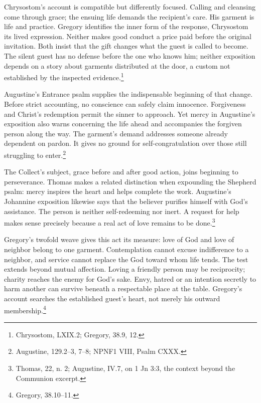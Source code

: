 Chrysostom's account is compatible but differently focused. Calling and cleansing come through grace; the ensuing life demands the recipient's care. His garment is life and practice. Gregory identifies the inner form of the response, Chrysostom its lived expression. Neither makes good conduct a price paid before the original invitation. Both insist that the gift changes what the guest is called to become. The silent guest has no defense before the one who knows him; neither exposition depends on a story about garments distributed at the door, a custom not established by the inspected evidence.\footnote{Chrysostom,  LXIX.2; Gregory,  38.9, 12.}

Augustine's Entrance psalm supplies the indispensable beginning of that change. Before strict accounting, no conscience can safely claim innocence. Forgiveness and Christ's redemption permit the sinner to approach. Yet mercy in Augustine's exposition also warns concerning the life ahead and accompanies the forgiven person along the way. The garment's demand addresses someone already dependent on pardon. It gives no ground for self-congratulation over those still struggling to enter.\footnote{Augustine,  129.2--3, 7--8; NPNF1 VIII, Psalm CXXX.}

The Collect's subject, grace before and after good action, joins beginning to perseverance. Thomas makes a related distinction when expounding the Shepherd psalm: mercy inspires the heart and helps complete the work. Augustine's Johannine exposition likewise says that the believer purifies himself with God's assistance. The person is neither self-redeeming nor inert. A request for help makes sense precisely because a real act of love remains to be done.\footnote{Thomas,  22, n. 2; Augustine,  IV.7, on 1 Jn 3:3, the context beyond the Communion excerpt.}

Gregory's twofold weave gives this act its measure: love of God and love of neighbor belong to one garment. Contemplation cannot excuse indifference to a neighbor, and service cannot replace the God toward whom life tends. The test extends beyond mutual affection. Loving a friendly person may be reciprocity; charity reaches the enemy for God's sake. Envy, hatred or an intention secretly to harm another can survive beneath a respectable place at the table. Gregory's account searches the established guest's heart, not merely his outward membership.\footnote{Gregory,  38.10--11.}

